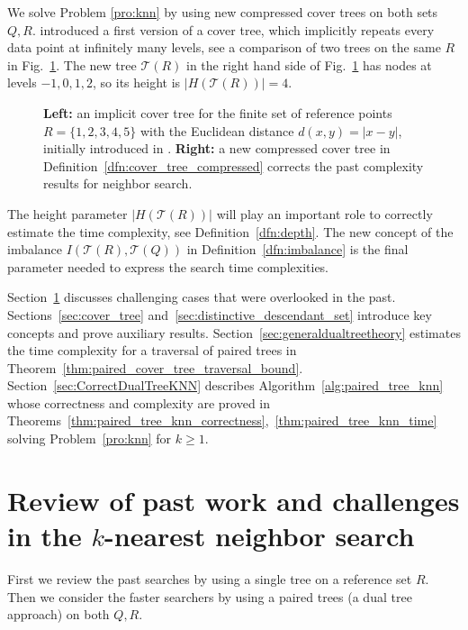 \documentclass[a4paper,UKenglish,cleveref, autoref]{lipics-v2019}
\numberwithin{algocf}{section}
\theoremstyle{definition}
\theoremstyle{definition}
\theoremstyle{definition}
\theoremstyle{plain}
\newcommand{\T}{\mathcal{T}}
\begin{document}
We solve Problem \ref{pro:knn} by using new compressed cover trees on both sets $Q,R$.
\cite[Section~2]{beygelzimer2006cover} introduced a first version of a cover tree, which implicitly repeats every data point at infinitely many levels, see a comparison of two trees on the same $R$ in
Fig.~\ref{fig:implicitcompressed}.
The new tree $\T(R)$ in the right hand side of Fig.~\ref{fig:implicitcompressed} has nodes at levels $-1,0,1,2$, so its height is $|H(\T(R))|=4$.
\medskip

\begin{figure}
\centering
 
\hspace{1.5cm}
 
  \caption{\textbf{Left:} an implicit cover tree for the finite set of reference points $R = \{1,2,3,4,5\}$ with the Euclidean distance $d(x,y) = |x-y|$, initially introduced in \cite[Section~2]{beygelzimer2006cover}. 
  \textbf{Right:} a new compressed cover tree in Definition~\ref{dfn:cover_tree_compressed} corrects the past complexity results for neighbor search.}
  \label{fig:implicitcompressed}
\end{figure}

The height parameter $|H(\T(R))|$ will play an important role to correctly estimate the time complexity, see Definition~\ref{dfn:depth}.
The new concept of the imbalance $I(\T(R),\T(Q))$ in Definition~\ref{dfn:imbalance} is the final parameter needed to express the search time complexities.
\medskip

Section~\ref{sec:review} discusses challenging cases that were overlooked in the past.
Sections~\ref{sec:cover_tree} and~\ref{sec:distinctive_descendant_set} introduce key concepts and prove auxiliary results.
Section~\ref{sec:generaldualtreetheory} estimates the time complexity for a traversal of paired trees in Theorem~\ref{thm:paired_cover_tree_traversal_bound}.
Section~\ref{sec:CorrectDualTreeKNN} describes Algorithm~\ref{alg:paired_tree_knn} whose correctness and complexity are proved in Theorems~\ref{thm:paired_tree_knn_correctness},~\ref{thm:paired_tree_knn_time} solving Problem~\ref{pro:knn} for $k\geq 1$.

\section{Review of past work and challenges in the $k$-nearest neighbor search}
\label{sec:review}

First we review the past searches by using a single tree on a reference set $R$.
Then we consider the faster searchers by using a paired trees (a dual tree approach) on both $Q,R$. 
\medskip
\end{document}
